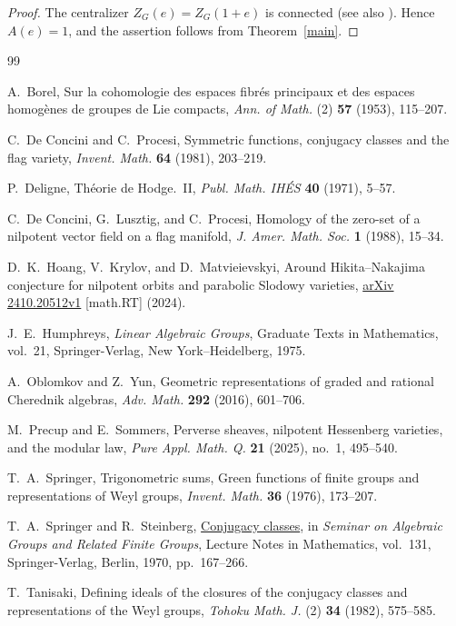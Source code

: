 \documentclass[12pt]{article}
\theoremstyle{paperplain}
\begin{document}
\begin{proof}
    The centralizer $Z_G(e)=Z_G(1+e)$ is connected \cite[III,~3.22]{SS} (see also \cite[Section~7.7]{Springer76}). Hence $A(e)=1$, and the assertion follows from Theorem~\ref{main}.
\end{proof}

\vspace{1em}
\begin{thebibliography}{99}
\setlength{\itemsep}{0pt}
\setlength{\parsep}{0pt}

    A.~Borel, Sur la cohomologie des espaces fibr\'es principaux et des espaces
    homog\`enes de groupes de Lie compacts,
    \emph{Ann. of Math.} (2) \textbf{57} (1953), 115--207.

    C.~De Concini and C.~Procesi,
    Symmetric functions, conjugacy classes and the flag variety,
    \emph{Invent. Math.} \textbf{64} (1981), 203--219.

    P.~Deligne, Th\'eorie de Hodge.~II,
    \emph{Publ. Math. IH\'ES} \textbf{40} (1971), 5--57.

    C.~De Concini, G.~Lusztig, and C.~Procesi,
    Homology of the zero-set of a nilpotent vector field on a flag manifold,
    \emph{J. Amer. Math. Soc.} \textbf{1} (1988), 15--34.

    D.~K.~Hoang, V.~Krylov, and D.~Matvieievskyi,
    Around Hikita--Nakajima conjecture for nilpotent orbits and parabolic
    Slodowy varieties,
    \href{https://arxiv.org/abs/2410.20512v1}{arXiv 2410.20512v1}
    [math.RT] (2024).

    J.~E.~Humphreys, \emph{Linear Algebraic Groups},
    Graduate Texts in Mathematics, vol.~21,
    Springer-Verlag, New York--Heidelberg, 1975.

    A.~Oblomkov and Z.~Yun,
    Geometric representations of graded and rational Cherednik algebras,
    \emph{Adv. Math.} \textbf{292} (2016), 601--706.

    M.~Precup and E.~Sommers,
    Perverse sheaves, nilpotent Hessenberg varieties, and the modular law,
    \emph{Pure Appl. Math. Q.} \textbf{21} (2025), no.~1, 495--540.

    T.~A.~Springer,
    Trigonometric sums, Green functions of finite groups and representations of Weyl groups,
    \emph{Invent. Math.} \textbf{36} (1976), 173--207.

    T.~A.~Springer and R.~Steinberg,
    \href{https://doi.org/10.1007/BFb0081546}{Conjugacy classes},
    in \emph{Seminar on Algebraic Groups and Related Finite Groups},
    Lecture Notes in Mathematics, vol.~131,
    Springer-Verlag, Berlin, 1970, pp.~167--266.

    T.~Tanisaki,
    Defining ideals of the closures of the conjugacy classes and representations of the Weyl groups,
    \emph{Tohoku Math. J.} (2) \textbf{34} (1982), 575--585.

\end{thebibliography}
\end{document}
